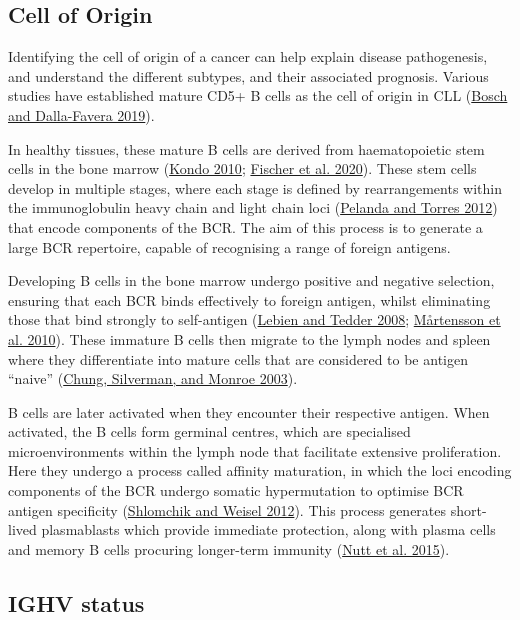 \documentclass[11pt, a4paper, twosided]{book}
\begin{document}
\hypertarget{intro-cell-of-origin}{%
\subsection{Cell of Origin}\label{intro-cell-of-origin}}

Identifying the cell of origin of a cancer can help explain disease pathogenesis, and understand the different subtypes, and their associated prognosis. Various studies have established mature CD5+ B cells as the cell of origin in CLL (\protect\hyperlink{ref-Bosch2019}{Bosch and Dalla-Favera 2019}).

In healthy tissues, these mature B cells are derived from haematopoietic stem cells in the bone marrow (\protect\hyperlink{ref-Kondo2010}{Kondo 2010}; \protect\hyperlink{ref-Fischer2020}{Fischer et al. 2020}). These stem cells develop in multiple stages, where each stage is defined by rearrangements within the immunoglobulin heavy chain and light chain loci (\protect\hyperlink{ref-Pelanda2012}{Pelanda and Torres 2012}) that encode components of the BCR. The aim of this process is to generate a large BCR repertoire, capable of recognising a range of foreign antigens.

Developing B cells in the bone marrow undergo positive and negative selection, ensuring that each BCR binds effectively to foreign antigen, whilst eliminating those that bind strongly to self-antigen (\protect\hyperlink{ref-Lebien2008}{Lebien and Tedder 2008}; \protect\hyperlink{ref-Martensson2010}{Mårtensson et al. 2010}). These immature B cells then migrate to the lymph nodes and spleen where they differentiate into mature cells that are considered to be antigen ``naive'' (\protect\hyperlink{ref-Chung2003}{Chung, Silverman, and Monroe 2003}).

B cells are later activated when they encounter their respective antigen. When activated, the B cells form germinal centres, which are specialised microenvironments within the lymph node that facilitate extensive proliferation. Here they undergo a process called affinity maturation, in which the loci encoding components of the BCR undergo somatic hypermutation to optimise BCR antigen specificity (\protect\hyperlink{ref-Shlomchik2012}{Shlomchik and Weisel 2012}). This process generates short-lived plasmablasts which provide immediate protection, along with plasma cells and memory B cells procuring longer-term immunity (\protect\hyperlink{ref-Nutt2015}{Nutt et al. 2015}).

\hypertarget{intro-ighv-status}{%
\subsection{IGHV status}\label{intro-ighv-status}}
\end{document}
